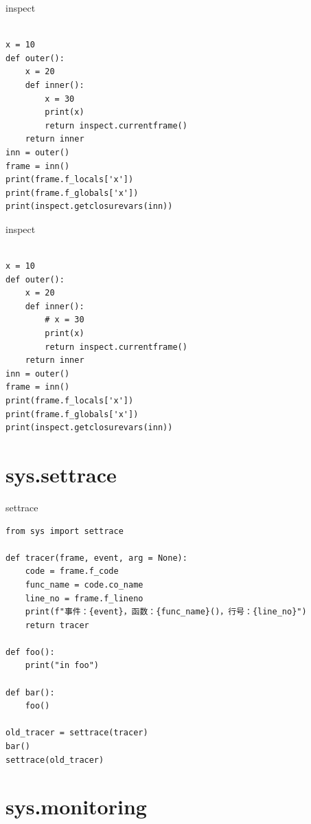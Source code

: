 \documentclass{beamer}
\let\oldfootnotesize\footnotesize
\renewcommand*{\footnotesize}{\oldfootnotesize\tiny}
\begin{document}
\begin{frame}[t,fragile]{inspect}
\begin{verbatim}

x = 10
def outer():
    x = 20
    def inner():
        x = 30
        print(x)
        return inspect.currentframe()
    return inner
inn = outer()
frame = inn()
print(frame.f_locals['x'])
print(frame.f_globals['x'])
print(inspect.getclosurevars(inn))

\end{verbatim}

	
\end{frame}
\begin{frame}[t,fragile]{inspect}
\begin{verbatim}

x = 10
def outer():
    x = 20
    def inner():
        # x = 30
        print(x)
        return inspect.currentframe()
    return inner
inn = outer()
frame = inn()
print(frame.f_locals['x'])
print(frame.f_globals['x'])
print(inspect.getclosurevars(inn))

\end{verbatim}

	
\end{frame}
\section{sys.settrace}


\begin{frame}[t,fragile]{settrace}
\footnotesize
\begin{verbatim}
from sys import settrace
  
def tracer(frame, event, arg = None):
    code = frame.f_code
    func_name = code.co_name
    line_no = frame.f_lineno
    print(f"事件：{event}，函数：{func_name}()，行号：{line_no}")
    return tracer

def foo():
    print("in foo")

def bar():
    foo()

old_tracer = settrace(tracer)
bar()
settrace(old_tracer)
\end{verbatim}
\end{frame}
\section{sys.monitoring}
\end{document}
